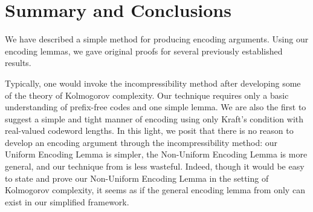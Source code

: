 \documentclass{patmorin}
\begin{document}
\section{Summary and Conclusions}

We have described a simple method for producing encoding
arguments. Using our encoding lemmas, we gave original proofs for
several previously established results.

Typically, one would invoke the incompressibility method after
developing some of the theory of Kolmogorov complexity. Our technique
requires only a basic understanding of prefix-free codes and one
simple lemma. We are also the first to suggest a simple and tight
manner of encoding using only Kraft's condition with real-valued
codeword lengths. In this light, we posit that there is no reason to
develop an encoding argument through the incompressibility method: our
Uniform Encoding Lemma is simpler, the Non-Uniform Encoding Lemma is
more general, and our technique from  is less
wasteful. Indeed, though it would be easy to state and prove our
Non-Uniform Encoding Lemma in the setting of Kolmogorov complexity, it
seems as if the general encoding lemma from  only can exist
in our simplified framework.

\end{document}
